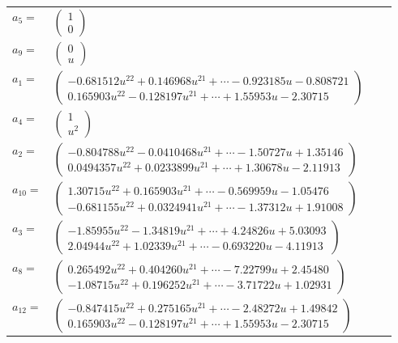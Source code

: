 \documentclass[1p]{elsarticle_modified}
\theoremstyle{definition}
\begin{document}
\begin{tabular}{m{7pt} m{180pt} m{7pt} m{180pt} }
\flushright $a_{5}=$&$\begin{pmatrix}1\\0\end{pmatrix}$ \\
\flushright $a_{9}=$&$\begin{pmatrix}0\\u\end{pmatrix}$ \\
\flushright $a_{1}=$&$\begin{pmatrix}-0.681512 u^{22}+0.146968 u^{21}+\cdots-0.923185 u-0.808721\\0.165903 u^{22}-0.128197 u^{21}+\cdots+1.55953 u-2.30715\end{pmatrix}$ \\
\flushright $a_{4}=$&$\begin{pmatrix}1\\u^2\end{pmatrix}$ \\
\flushright $a_{2}=$&$\begin{pmatrix}-0.804788 u^{22}-0.0410468 u^{21}+\cdots-1.50727 u+1.35146\\0.0494357 u^{22}+0.0233899 u^{21}+\cdots+1.30678 u-2.11913\end{pmatrix}$ \\
\flushright $a_{10}=$&$\begin{pmatrix}1.30715 u^{22}+0.165903 u^{21}+\cdots-0.569959 u-1.05476\\-0.681155 u^{22}+0.0324941 u^{21}+\cdots-1.37312 u+1.91008\end{pmatrix}$ \\
\flushright $a_{3}=$&$\begin{pmatrix}-1.85955 u^{22}-1.34819 u^{21}+\cdots+4.24826 u+5.03093\\2.04944 u^{22}+1.02339 u^{21}+\cdots-0.693220 u-4.11913\end{pmatrix}$ \\
\flushright $a_{8}=$&$\begin{pmatrix}0.265492 u^{22}+0.404260 u^{21}+\cdots-7.22799 u+2.45480\\-1.08715 u^{22}+0.196252 u^{21}+\cdots-3.71722 u+1.02931\end{pmatrix}$ \\
\flushright $a_{12}=$&$\begin{pmatrix}-0.847415 u^{22}+0.275165 u^{21}+\cdots-2.48272 u+1.49842\\0.165903 u^{22}-0.128197 u^{21}+\cdots+1.55953 u-2.30715\end{pmatrix}$ \\

\end{tabular}
\end{document}

